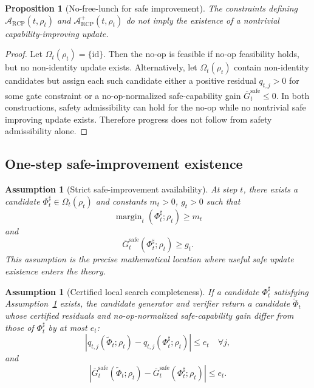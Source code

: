 \documentclass[11pt]{article}
\newtheorem{proposition}[theorem]{Proposition}
\newtheorem{assumption}[theorem]{Assumption}
\newcommand{\Acal}{\mathcal{A}}
\newcommand{\id}{\mathrm{id}}
\newcommand{\1}{\mathbf{1}}
\newcommand{\RCP}{\mathrm{RCP}}
\newcommand{\safe}{\mathrm{safe}}
\newcommand{\margin}{\operatorname{margin}}
\begin{document}
\begin{proposition}[No-free-lunch for safe improvement]
\label{prop:no_free_lunch_progress}
The constraints defining \(\Acal_{\RCP}(t,\rho_t)\) and \(\Acal_{\RCP}^{+}(t,\rho_t)\) do not imply the existence of a nontrivial capability-improving update.
\end{proposition}

\begin{proof}
Let \(\Omega_t(\rho_t)=\{\id\}\).  Then the no-op is feasible if no-op feasibility holds, but no non-identity update exists.  Alternatively, let \(\Omega_t(\rho_t)\) contain non-identity candidates but assign each such candidate either a positive residual \(q_{t,j}>0\) for some gate constraint or a no-op-normalized safe-capability gain \(\overline G_t^{\safe}\le0\).  In both constructions, safety admissibility can hold for the no-op while no nontrivial safe improving update exists.  Therefore progress does not follow from safety admissibility alone.
\end{proof}

\subsection{One-step safe-improvement existence}

\begin{assumption}[Strict safe-improvement availability]
\label{ass:strict_safe_improvement_availability}
At step \(t\), there exists a candidate \(\Phi_t^\sharp\in\Omega_t(\rho_t)\) and constants \(m_t>0\), \(g_t>0\) such that
\[
\margin_t(\Phi_t^\sharp;\rho_t)\ge m_t
\]
and
\[
\overline G_t^{\safe}(\Phi_t^\sharp;\rho_t)
\ge g_t.
\]
This assumption is the precise mathematical location where useful safe update existence enters the theory.
\end{assumption}

\begin{assumption}[Certified local search completeness]
\label{ass:certified_search_completeness}
If a candidate \(\Phi_t^\sharp\) satisfying Assumption~\ref{ass:strict_safe_improvement_availability} exists, the candidate generator and verifier return a candidate \(\widetilde\Phi_t\) whose certified residuals and no-op-normalized safe-capability gain differ from those of \(\Phi_t^\sharp\) by at most \(e_t\):
\[
|q_{t,j}(\widetilde\Phi_t;\rho_t)-q_{t,j}(\Phi_t^\sharp;\rho_t)|\le e_t
\quad\forall j,
\]
and
\[
|\overline G_t^{\safe}(\widetilde\Phi_t;\rho_t)
-
\overline G_t^{\safe}(\Phi_t^\sharp;\rho_t)|\le e_t.
\]
\end{assumption}
\end{document}
